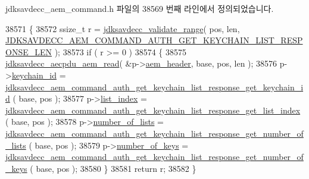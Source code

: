 jdksavdecc\+\_\+aem\+\_\+command.\+h 파일의 38569 번째 라인에서 정의되었습니다.


\begin{DoxyCode}
38571 \{
38572     ssize\_t r = \hyperlink{group__util_ga9c02bdfe76c69163647c3196db7a73a1}{jdksavdecc\_validate\_range}( pos, len, 
      \hyperlink{group__command__auth__get__keychain__list__response_ga884aaa001eecfb7bfea4d495ad8f31a0}{JDKSAVDECC\_AEM\_COMMAND\_AUTH\_GET\_KEYCHAIN\_LIST\_RESPONSE\_LEN}
       );
38573     \textcolor{keywordflow}{if} ( r >= 0 )
38574     \{
38575         \hyperlink{group__aecpdu__aem_gae2421015dcdce745b4f03832e12b4fb6}{jdksavdecc\_aecpdu\_aem\_read}( &p->\hyperlink{structjdksavdecc__aem__command__auth__get__keychain__list__response_ae1e77ccb75ff5021ad923221eab38294}{aem\_header}, base, pos, len );
38576         p->\hyperlink{structjdksavdecc__aem__command__auth__get__keychain__list__response_a10ed6547e01665c453e2a40b142f7526}{keychain\_id} = 
      \hyperlink{group__command__auth__get__keychain__list__response_gae1500e4f77cb98f34426d4d84130412d}{jdksavdecc\_aem\_command\_auth\_get\_keychain\_list\_response\_get\_keychain\_id}
      ( base, pos );
38577         p->\hyperlink{structjdksavdecc__aem__command__auth__get__keychain__list__response_a2860632dbc7912d3e434203be8f2d9da}{list\_index} = 
      \hyperlink{group__command__auth__get__keychain__list__response_ga2a77f4181b7f59ee692a3c64f0d5396b}{jdksavdecc\_aem\_command\_auth\_get\_keychain\_list\_response\_get\_list\_index}
      ( base, pos );
38578         p->\hyperlink{structjdksavdecc__aem__command__auth__get__keychain__list__response_a45b14c0c59fa21d49e896c11e3344c54}{number\_of\_lists} = 
      \hyperlink{group__command__auth__get__keychain__list__response_gaa937bedc129318715327f79c0f53971f}{jdksavdecc\_aem\_command\_auth\_get\_keychain\_list\_response\_get\_number\_of\_lists}
      ( base, pos );
38579         p->\hyperlink{structjdksavdecc__aem__command__auth__get__keychain__list__response_a4b5b63e09e22100325d6689bfbe02865}{number\_of\_keys} = 
      \hyperlink{group__command__auth__get__keychain__list__response_ga8ad0899731126810ac06863ab664020e}{jdksavdecc\_aem\_command\_auth\_get\_keychain\_list\_response\_get\_number\_of\_keys}
      ( base, pos );
38580     \}
38581     \textcolor{keywordflow}{return} r;
38582 \}
\end{DoxyCode}


